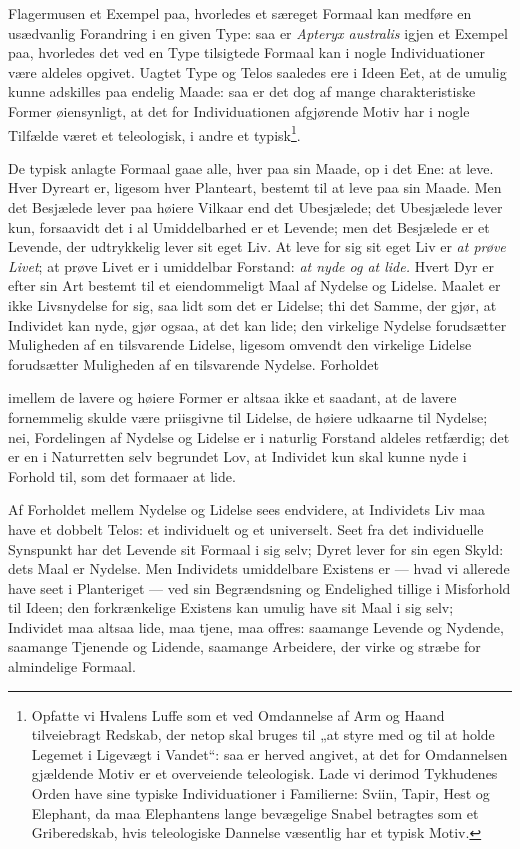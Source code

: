 \documentclass[12pt,a4paper]{book}
\begin{document}
\setcounter{footnote}{0}
Flagermusen et Exempel paa, hvorledes et særeget Formaal kan medføre en
usædvanlig Forandring i en given Type: saa er \textit{Apteryx australis} igjen
et Exempel paa, hvorledes det ved en Type tilsigtede Formaal kan i nogle
Individuationer være aldeles opgivet. Uagtet Type og Telos saaledes ere i Ideen
Eet, at de umulig kunne adskilles paa endelig Maade: saa er det dog af mange
charakteristiske Former øiensynligt, at det for Individuationen afgjørende Motiv
har i nogle Tilfælde været et teleologisk, i andre et
typisk\footnote{Opfatte vi Hvalens Luffe som et ved Omdannelse af Arm og Haand
tilveiebragt Redskab, der netop skal bruges til „at styre med og til at holde
Legemet i Ligevægt i Vandet“: saa er herved angivet, at det for Omdannelsen
gjældende Motiv er et overveiende teleologisk. Lade vi derimod Tykhudenes Orden
have sine typiske Individuationer i Familierne: Sviin, Tapir, Hest og Elephant,
da maa Elephantens lange bevægelige Snabel betragtes som et Griberedskab, hvis
teleologiske Dannelse væsentlig har et typisk Motiv.}.

De typisk anlagte Formaal gaae alle, hver paa sin Maade, op i det Ene: at leve.
Hver Dyreart er, ligesom hver Planteart, bestemt til at leve paa sin Maade. Men
det Besjælede lever paa høiere Vilkaar end det Ubesjælede; det Ubesjælede lever
kun, forsaavidt det i al Umiddelbarhed er et Levende; men det Besjælede er et
Levende, der udtrykkelig lever sit eget Liv. At leve for sig sit eget Liv er
\emph{at prøve Livet}; at prøve Livet er i umiddelbar Forstand: \emph{at nyde og
at lide.} Hvert Dyr er efter sin Art bestemt til et eiendommeligt Maal af
Nydelse og Lidelse. Maalet er ikke Livsnydelse for sig, saa lidt som det er
Lidelse; thi det Samme, der gjør, at Individet kan nyde, gjør ogsaa, at det kan
lide; den virkelige Nydelse forudsætter Muligheden af en tilsvarende Lidelse,
ligesom omvendt den virkelige Lidelse forudsætter Muligheden af en tilsvarende
Nydelse. Forholdet

imellem de lavere og høiere Former er altsaa ikke et saadant, at de lavere
fornemmelig skulde være priisgivne til Lidelse, de høiere udkaarne til Nydelse;
nei, Fordelingen af Nydelse og Lidelse er i naturlig Forstand aldeles
retfærdig; det er en i Naturretten selv begrundet Lov, at Individet kun skal
kunne nyde i Forhold til, som det formaaer at lide.

Af Forholdet mellem Nydelse og Lidelse sees endvidere, at Individets Liv maa
have et dobbelt Telos: et individuelt og et universelt. Seet fra det individuelle
Synspunkt har det Levende sit Formaal i sig selv; Dyret lever for sin egen
Skyld: dets Maal er Nydelse. Men Individets umiddelbare Existens er --- hvad vi
allerede have seet i Planteriget --- ved sin Begrændsning og Endelighed tillige
i Misforhold til Ideen; den forkrænkelige Existens kan umulig have sit Maal i
sig selv; Individet maa altsaa lide, maa tjene, maa offres: saamange Levende og
Nydende, saamange Tjenende og Lidende, saamange Arbeidere, der virke og stræbe
for almindelige Formaal.
\end{document}
